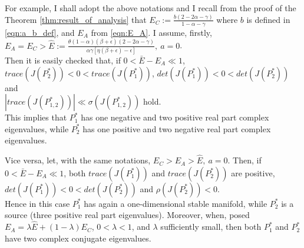 For example, I shall adopt the above notations and I recall from the proof of the Theorem \ref{thm:result_of_analysis} that $E_C := \frac{b(2-2\alpha-\gamma)}{1-\alpha-\gamma}$ where $b$ is defined in \eqref{eqn:a_b_def}, and $E_A$ from \eqref{eqn:E_A}. I assume, firstly, 
$E_A=E_C>\widehat{E}:=\frac{\theta(1-\alpha)(\beta+\epsilon)(2-2\alpha-\gamma)}{\alpha\gamma[\eta(\beta+\epsilon)-\epsilon]},\ a=0$.\\
Then it is easily checked that, if $0<\bar{E}-E_A\ll 1$, \\
$trace(J(P_2^*))<0<trace(J(P_1^*))$, $det(J(P_1^*))<0<det(J(P_2^*))$ and\\
$|trace(J(P_{1,2}^*))|\ll \sigma(J(P_{1,2}^*))$ hold.\\
This implies that $P_1^*$ has one negative and two positive real part complex eigenvalues, while $P_2^*$ has one positive and two negative real part complex eigenvalues.

Vice versa, let, with the same notations, $E_C>E_A>\widehat{E},\ a=0.$ Then, if $0<\bar{E}-E_A\ll 1$, both $trace(J(P_1^*))$ and $trace(J(P_2^*))$ are positive,\\ $det(J(P_1^*))<0<det(J(P_2^*))$ and $\rho(J(P_2^*))<0$.\\
Hence in this case $P_1^*$ has again a one-dimensional stable manifold, while $P_2^*$ is a source (three positive real part eigenvalues). Moreover, when, posed $E_A=\lambda\widehat{E}+(1-\lambda)E_C$, $0<\lambda<1$, and $\lambda$ sufficiently small, then both $P_1^*$ and $P_2^*$ have two complex conjugate eigenvalues.

